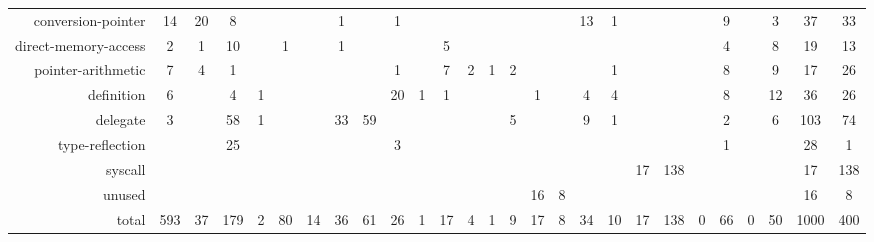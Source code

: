 \begin{table*}[!t]
\begin{adjustbox}{max width=\textwidth}
\begin{tabular}{r|cc|cc|cc|cc|cc|cc|cc|cc|cc|cc|cc|cc|cc}
       conversion-pointer &   14 &   20 &    8 &      &      &      &    1 &      &    1 &      &      &      &      &      &      &      &   13 &    1 &       &      &      &    9 &      &    3 &    37 &   33 \\
\rowcolor{verylightgray}
     direct-memory-access &    2 &    1 &   10 &      &    1 &      &    1 &      &      &      &    5 &      &      &      &      &      &      &      &       &      &      &    4 &      &    8 &    19 &   13 \\
       pointer-arithmetic &    7 &    4 &    1 &      &      &      &      &      &    1 &      &    7 &    2 &    1 &    2 &      &      &      &    1 &       &      &      &    8 &      &    9 &    17 &   26 \\
\rowcolor{verylightgray}
               definition &    6 &      &    4 &    1 &      &      &      &      &   20 &    1 &    1 &      &      &      &    1 &      &    4 &    4 &       &      &      &    8 &      &   12 &    36 &   26 \\
                 delegate &    3 &      &   58 &    1 &      &      &   33 &   59 &      &      &      &      &      &    5 &      &      &    9 &    1 &       &      &      &    2 &      &    6 &   103 &   74 \\
\rowcolor{verylightgray}
          type-reflection &      &      &   25 &      &      &      &      &      &    3 &      &      &      &      &      &      &      &      &      &       &      &      &    1 &      &      &    28 &    1 \\
                  syscall &      &      &      &      &      &      &      &      &      &      &      &      &      &      &      &      &      &      &    17 &  138 &      &      &      &      &    17 &  138 \\
\rowcolor{verylightgray}
                   unused &      &      &      &      &      &      &      &      &      &      &      &      &      &      &   16 &    8 &      &      &       &      &      &      &      &      &    16 &    8 \\ \hline
                        total &  593 &   37 &  179 &    2 &   80 &   14 &   36 &   61 &   26 &    1 &   17 &    4 &    1 &    9 &   17 &    8 &   34 &   10 &    17 &  138 &    0 &   66 &    0 &   50 &  1000 &  400 \\
\end{tabular}
    \end{adjustbox}
\end{table*}